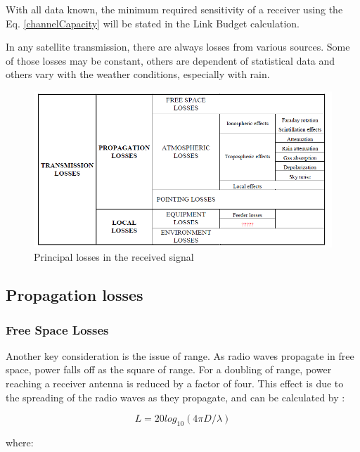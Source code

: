 With all data known, the minimum required sensitivity of a receiver using the Eq. \ref{channelCapacity} will be stated in the Link Budget calculation.

In any satellite transmission, there are always losses from various sources. Some of
those losses may be constant, others are dependent of statistical data and others vary
with the weather conditions, especially with rain.

\begin{figure}[H]
	\includegraphics[scale=0.6]{./sections/SatelliteDept/sections/images/principal_losses}
	\centering
	\caption[Principal losses in the received signal]{Principal losses in the received signal \cite{Jorge2012}}
	\label{principal_losses}
\end{figure}

\subsection{Propagation losses}
\subsubsection{Free Space Losses}
Another key consideration is the issue of range. As radio waves propagate in free space, power falls off as the square of range. For a doubling of range, power reaching a receiver antenna is reduced by a factor of four. This effect is due to the spreading of the radio waves as they propagate, and can be calculated by \cite{Note1998}:

\begin{equation}
L=20log_{10}(4\pi D/\lambda)
\label{FSP}
\end{equation}

where:

